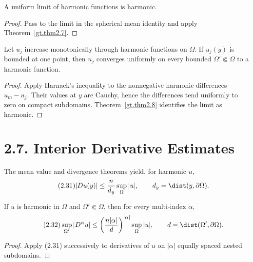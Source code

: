 \begin{theorem}\label{gt.thm2.8}
A uniform limit of harmonic functions is harmonic.
\end{theorem}
\begin{proof}
\sketch Pass to the limit in the spherical mean identity and apply
Theorem~\ref{gt.thm2.7}.
\end{proof}

\begin{theorem}\label{gt.thm2.9}
Let $u_j$ increase monotonically through harmonic functions on $\Omega$. If
$u_j(y)$ is bounded at one point, then $u_j$ converges uniformly on every
bounded $\Omega'\Subset\Omega$ to a harmonic function.
\end{theorem}
\begin{proof}
\sketch Apply Harnack's inequality to the nonnegative harmonic differences
$u_m-u_j$. Their values at $y$ are Cauchy, hence the differences tend
uniformly to zero on compact subdomains. Theorem~\ref{gt.thm2.8} identifies
the limit as harmonic.
\end{proof}

\section*{2.7. Interior Derivative Estimates}

The mean value and divergence theorems yield, for harmonic $u$,
\begin{equation}
\tag{2.31}
|Du(y)|\leq\frac{n}{d_y}\sup_\Omega|u|,
\qquad d_y=\dist(y,\partial\Omega).
\end{equation}

\begin{theorem}
\label{gt.thm2.10}
If $u$ is harmonic in $\Omega$ and $\Omega'\Subset\Omega$, then for every
multi-index $\alpha$,
\begin{equation}
\tag{2.32}
\sup_{\Omega'}|D^\alpha u|
\leq\left(\frac{n|\alpha|}{d}\right)^{|\alpha|}
\sup_\Omega|u|,
\qquad d=\dist(\Omega',\partial\Omega).
\end{equation}
\end{theorem}
\begin{proof}
\sketch Apply (2.31) successively to derivatives of $u$ on
$|\alpha|$ equally spaced nested subdomains.
\end{proof}


